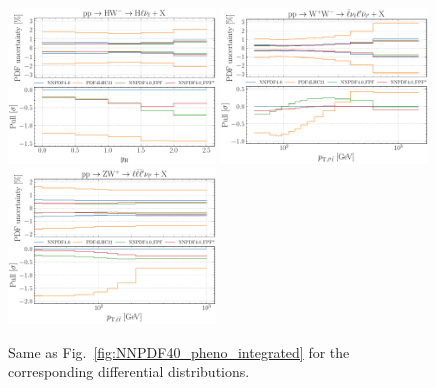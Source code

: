 \begin{figure}[t]
\includegraphics[width=0.49\textwidth]{plots/LHCpheno/NNPDF_HWM_14TEV_40_PHENO-global.pdf}
\includegraphics[width=0.49\textwidth]{plots/LHCpheno/NNPDF_WPWM_14TEV_40_PHENO-global.pdf}
\includegraphics[width=0.49\textwidth]{plots/LHCpheno/NNPDF_WPZ_14TEV_40_PHENO-global.pdf}
\caption{Same as Fig.~\ref{fig:NNPDF40_pheno_integrated}
for the corresponding differential distributions.
%
}
\label{fig:NNPDF40_pheno_differential}
\end{figure}
